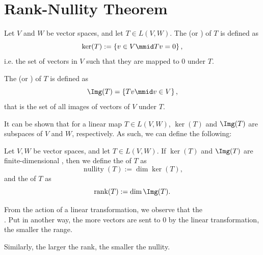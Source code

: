 \documentclass[notoc,notitlepage]{tufte-book}
\DeclareMathOperator{\nullity}{nullity}
\DeclareMathOperator{\rank}{rank}
\begin{document}
\section{Rank-Nullity Theorem}%
\label{sec:rank_nullity_theorem}

\nocite{stephen2002}

\begin{defn}\label{defn:kernel_and_image}
  Let $V$ and $W$ be vector spaces, and let $T \in L(V, W)$.
  The  (or ) of $T$ is defined as
  \begin{equation*}
    \ker(T) := \left\{ v \in V \mmid Tv = 0 \right\},
  \end{equation*}
  i.e. the set of vectors in $V$ such that they are mapped to $0$ under $T$.

  The  (or ) of $T$ is defined as
  \begin{equation*}
    \Img(T) = \left\{ Tv \mmid v \in V \right\},
  \end{equation*}
  that is the set of all images of vectors of $V$ under $T$.
\end{defn}

It can be shown that for a linear map $T \in L(V, W)$,
$\ker (T)$ and $\Img(T)$ are subspaces of $V$ and $W$, respectively.
As such, we can define the following:

\begin{defn}\label{defn:rank_and_nullity}
  Let $V, W$ be vector spaces, and let $T \in L(V, W)$.
  If $\ker(T)$ and $\Img(T)$ are finite-dimensional
  ,
  then we define the  of $T$ as
  \begin{equation*}
    \nullity(T) := \dim \ker (T),
  \end{equation*}
  and the  of $T$ as
  \begin{equation*}
    \rank(T) := \dim \Img(T).
  \end{equation*}
\end{defn}

\begin{note}
  From the action of a linear transformation, we observe that the \\
  \noindent
  .
  Put in another way, the more vectors are sent to $0$ by the linear transformation,
  the smaller the range.

  Similarly, the larger the rank, the smaller the nullity.
\end{note}
\end{document}
